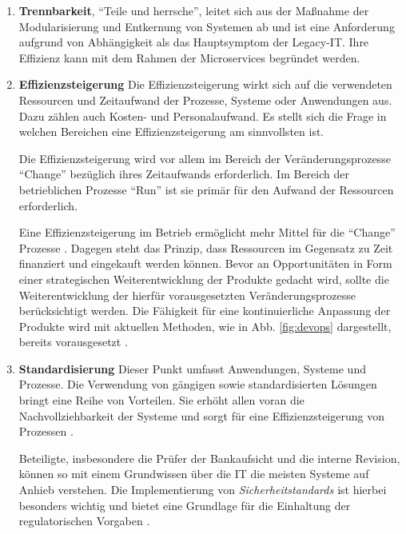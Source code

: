 \begin{enumerate}
\item \textbf{Trennbarkeit},
    \enquote{Teile und herrsche}, leitet sich aus der Maßnahme der Modularisierung und Entkernung von Systemen \citet{Bussmann2006} ab und ist eine Anforderung aufgrund von Abhängigkeit als das Hauptsymptom der Legacy-IT. Ihre Effizienz kann mit dem Rahmen der Microservices begründet werden.

\item \textbf{Effizienzsteigerung}
    Die Effizienzsteigerung wirkt sich auf die verwendeten Ressourcen und Zeitaufwand der Prozesse, Systeme oder Anwendungen aus. Dazu zählen auch Kosten- und Personalaufwand. Es stellt sich die Frage in welchen Bereichen eine Effizienzsteigerung am sinnvollsten ist.
    
    Die Effizienzsteigerung wird vor allem im Bereich der Veränderungsprozesse \enquote{Change} bezüglich ihres Zeitaufwands erforderlich. Im Bereich der betrieblichen Prozesse \enquote{Run} ist sie primär für den Aufwand der Ressourcen erforderlich.
    
    Eine Effizienzsteigerung im Betrieb ermöglicht mehr Mittel für die \enquote{Change} Prozesse \cite{Rausch2006}. Dagegen steht das Prinzip, dass Ressourcen im Gegensatz zu Zeit finanziert und eingekauft werden können. Bevor an Opportunitäten in Form einer strategischen Weiterentwicklung der Produkte \cite{Rausch2006} gedacht wird, sollte die Weiterentwicklung der hierfür vorausgesetzten Veränderungsprozesse berücksichtigt werden. Die Fähigkeit für eine kontinuierliche Anpassung \cite{Bussmann2006, Ganswindt2006} der Produkte wird mit aktuellen Methoden, wie in Abb. \ref{fig:devops} dargestellt, bereits vorausgesetzt \cite{Alt2017}.
    
    \item \textbf{Standardisierung}
    Dieser Punkt umfasst Anwendungen, Systeme und Prozesse. Die Verwendung von gängigen sowie standardisierten Lösungen bringt eine Reihe von Vorteilen. Sie erhöht allen voran die Nachvollziehbarkeit der Systeme und sorgt für eine Effizienzsteigerung von Prozessen \cite{Strietzel2018, Bussmann2006, Alt2017}. 
    
    Beteiligte, insbesondere die Prüfer der Bankaufsicht und die interne Revision, können so mit einem Grundwissen über die IT die meisten Systeme auf Anhieb verstehen. Die Implementierung von \emph{Sicherheitstandards \cite{IT-Grundschutz:2020, Disterer2013}} ist hierbei besonders wichtig und bietet eine Grundlage für die Einhaltung der regulatorischen Vorgaben \cite{MaRisk:2017, BAIT:2018}.
    

\end{enumerate}
